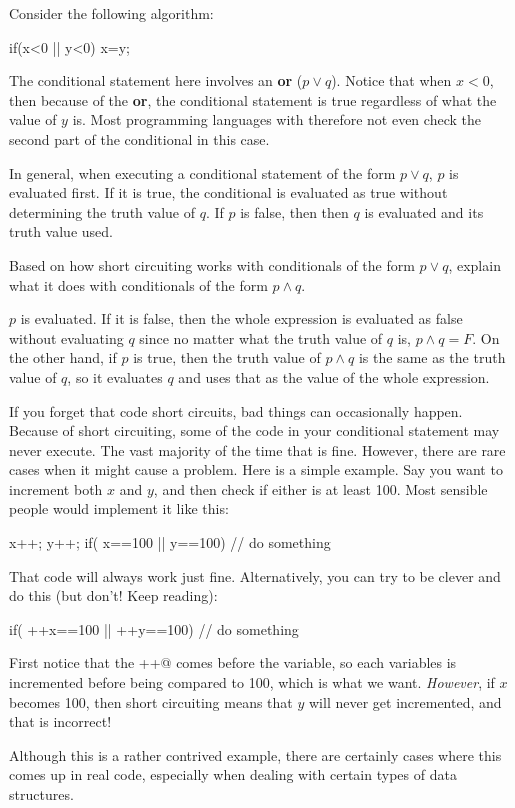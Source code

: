 \begin{exa}
Consider the following algorithm:
\begin{code}
if(x<0 || y<0) {
    x=y;
}
\end{code}
The conditional statement here involves an {\bf or} ($p\vee q$).
Notice that when $x<0$, then because of the {\bf or}, 
the conditional statement is true regardless of what the value of $y$ is. 
Most programming languages with therefore not even check the second part of the conditional in this case.

In general, when executing a conditional statement of the form
$p\vee q$,
$p$ is evaluated first. If it is true, the conditional is evaluated as true without determining the truth value of $q$. If $p$ is false,
then then $q$ is evaluated and its truth value used.
\end{exa}

\begin{exer}
Based on how short circuiting works with conditionals of the
form $p\vee q$, explain what it does with conditionals 
of the form $p\wedge q$.
\vspace*{1.75in}

\begin{answer}
$p$ is evaluated. If it is false, then the whole expression is evaluated 
as false without evaluating $q$ since no matter what the truth 
value of $q$ is, $p\wedge q=F$. On the other hand, if
$p$ is true, then the truth value of $p\wedge q$ is the same as
the truth value of $q$, so it evaluates $q$ and uses that as
the value of the whole expression.
\end{answer}
\end{exer}

\begin{rem}
If you forget that code short circuits, bad things can occasionally
happen.
Because of short circuiting, some of the code in your
conditional statement may never execute. 
The vast majority of the time that is fine.
However, there are rare cases when it might cause a problem.
Here is a simple example.
Say you want to increment both $x$ and $y$, and
then check if either is at least 100. 
Most sensible people would implement it like this:
{\rm
\begin{code}
    x++;
    y++;
    if( x==100 || y==100) {
        // do something
    }
\end{code}
}
That code will always work just fine. 
Alternatively, you can try to be clever and do this
(but don't! Keep reading):
{\rm
\begin{code}
    if( ++x==100 || ++y==100) {
        // do something
    }
\end{code}
}
First notice that the \verb@++@ comes before the variable,
so each variables is incremented before being compared to 100,
which is what we want. {\em However}, if $x$ becomes 100, then
short circuiting means that $y$ will never get incremented,
and that is incorrect!

Although this is a rather contrived example, there are certainly
cases where this comes up in real code, especially when dealing
with certain types of data structures.
\end{rem}

